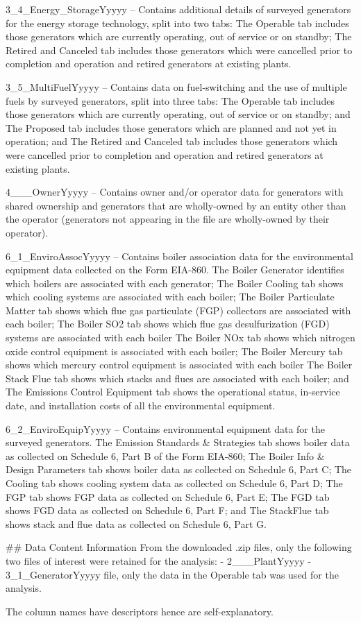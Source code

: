 3_4_Energy_StorageYyyyy – Contains additional details of surveyed generators for the energy storage technology, split into two tabs:
The Operable tab includes those generators which are currently operating, out of service or on standby;
The Retired and Canceled tab includes those generators which were cancelled prior to completion and operation and retired generators at existing plants.

3_5_MultiFuelYyyyy – Contains data on fuel-switching and the use of multiple fuels by surveyed generators, split into three tabs:
The Operable tab includes those generators which are currently operating, out of service or on standby; and
The Proposed tab includes those generators which are planned and not yet in operation; and
The Retired and Canceled tab includes those generators which were cancelled prior to completion and operation and retired generators at existing plants.

4___OwnerYyyyy – Contains owner and/or operator data for generators with shared ownership and generators that are wholly-owned by an entity other than the operator (generators not appearing in the file are wholly-owned by their operator).

6_1_EnviroAssocYyyyy – Contains boiler association data for the environmental equipment data collected on the Form EIA-860.
The Boiler Generator identifies which boilers are associated with each generator;
The Boiler Cooling tab shows which cooling systems are associated with each boiler;
The Boiler Particulate Matter tab shows which flue gas particulate (FGP) collectors are associated with each boiler;
The Boiler SO2 tab shows which flue gas desulfurization (FGD) systems are associated with each boiler
The Boiler NOx tab shows which nitrogen oxide control equipment is associated with each boiler;
The Boiler Mercury tab shows which mercury control equipment is associated with each boiler
The Boiler Stack Flue tab shows which stacks and flues are associated with each boiler; and
The Emissions Control Equipment tab shows the operational status, in-service date, and installation costs of all the environmental equipment.

6_2_EnviroEquipYyyyy – Contains environmental equipment data for the surveyed generators.
The Emission Standards & Strategies tab shows boiler data as collected on Schedule 6, Part B of the Form EIA-860;
The Boiler Info & Design Parameters tab shows boiler data as collected on Schedule 6, Part C;
The Cooling tab shows cooling system data as collected on Schedule 6, Part D;
The FGP tab shows FGP data as collected on Schedule 6, Part E;
The FGD tab shows FGD data as collected on Schedule 6, Part F; and
The StackFlue tab shows stack and flue data as collected on Schedule 6, Part G.


## Data Content Information
From the downloaded .zip files, only the following two files of interest were retained for the analysis: 
- 2___PlantYyyyy 
- 3_1_GeneratorYyyyy file, only the data in the Operable tab was used for the analysis.

The column names have descriptors hence are self-explanatory.

